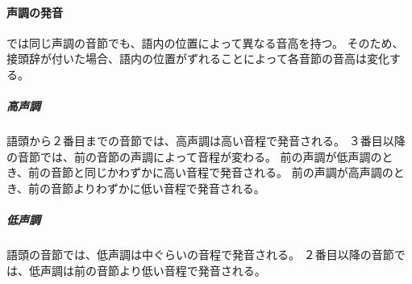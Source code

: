 \paragraph{声調の発音}
\langname では同じ声調の音節でも、語内の位置によって異なる音高を持つ。
そのため、接頭辞が付いた場合、語内の位置がずれることによって各音節の音高は変化する。

\subparagraph{高声調}
語頭から２番目までの音節では、高声調は高い音程で発音される。
３番目以降の音節では、前の音節の声調によって音程が変わる。
前の声調が低声調のとき、前の音節と同じかわずかに高い音程で発音される。
前の声調が高声調のとき、前の音節よりわずかに低い音程で発音される。

\subparagraph{低声調}
語頭の音節では、低声調は中ぐらいの音程で発音される。
２番目以降の音節では、低声調は前の音節より低い音程で発音される。
